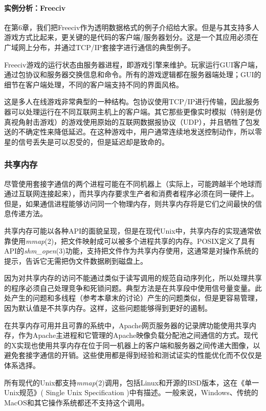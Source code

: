 \documentclass[12pt,oneside]{book}
\begin{document}
\begin{common-format}
\paragraph{实例分析：Freeciv}
在第6章，我们把Freeciv作为透明数据格式的例子介绍给大家。但是与其支持多人游戏方式比起来，更关键的是代码的客户端/服务器划分。这是一个其应用必须在广域网上分布，并通过TCP/IP套接字进行通信的典型例子。

Freeciv游戏的运行状态由服务器进程，即游戏引擎来维护。玩家运行GUI客户端，通过包协议和服务器交换信息和命令。所有的游戏逻辑都在服务器端处理；GUI的细节在客户端处理，不同的客户端支持不同的界面风格。

这是多人在线游戏非常典型的一种结构。包协议使用TCP/IP进行传输，因此服务器可以处理运行在不同互联网主机上的客户端。其它那些更像实时模拟（特别是仿真视角射击游戏）的游戏使用原始的互联网数据报协议（UDP），并且牺牲了包发送的不确定性来降低延迟。在这种游戏中，用户通常连续地发送控制动作，所以零星的信号丢失是可以忍受的，但是延迟却是致命的。


\subsubsection{共享内存}
尽管使用套接字通信的两个进程可能在不同机器上（实际上，可能跨越半个地球而通过互联网连接起来），而共享内存要求生产者和消费者程序必须在同一硬件上。但是，如果通信进程能够访问同一个物理内存，则共享内存将是它们之间最快的信息传递方法。

共享内存可能以各种API的面貌呈现，但是在现代Unix中，共享内存的实现通常依靠使用\textit{mmap}(2)，把文件映射成可以被多个进程共享的内存。POSIX定义了具有API的\textit{shm\_{}open}(3)功能，支持把文件作为共享内存使用，这通常是对操作系统的提示，告诉它无需把伪文件数据刷到磁盘上。

因为对共享内存的访问不能通过类似于读写调用的规范自动序列化，所以处理共享的程序必须自己处理竞争和死锁问题。典型方法是在共享段中使用信号量变量。此处产生的问题和多线程（参考本章末的讨论）产生的问题类似，但是更容易管理，因为默认值是不共享内存。这样，这些问题能够得到更好的遏制。

在共享内存可用并且可靠的系统中，Apache网页服务器的记录牌功能使用共享内存，作为Apache主进程和它管理的Apache映像负载分配池之间通信的方式。现代的X实现也使用共享内存在位于同一机器上的客户端和服务器之间传递大图像，以避免套接字通信的开销。这些使用都是得到经验和测试证实的性能优化而不仅仅是体系选择。

所有现代的Unix都支持\textit{mmap}(2)调用，包括Linux和开源的BSD版本，这在《单一Unix规范》( Single Unix Specification )中有描述。一般来说，Windows、传统的MacOS和其它操作系统都还不支持这个调用。


\end{common-format}
\end{document}
